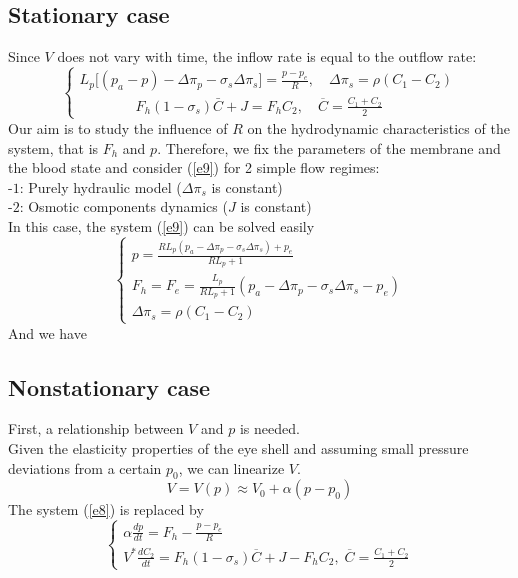 \documentclass[english,12pt]{article}
\begin{document}
\subsection{Stationary case}
Since $V$ does not vary with time, the inflow rate is equal to the outflow rate:
\begin{equation}\label{e9}
\left\{\begin{array}{ll}
L_p \big[ (p_a-p)- \Delta\pi_{p}-\sigma_{s} \Delta\pi_{s}\big]=\displaystyle{\frac{p-p_{e}}{R}}, \quad \Delta\pi_{s}=\rho(C_1-C_{2})\\
\qquad\qquad F_h (1-\sigma_s) \bar{C}+J=F_h C_2, \quad\overline{C}= \displaystyle{\frac{C_1+C_2}{2}}
\end{array}\right.
\end{equation}
Our aim is to study the influence of $R$ on the hydrodynamic characteristics of the system, that is $F_h$ and $p$. Therefore, we fix the parameters of the membrane and the blood state and consider (\ref{e9}) for 2 simple flow regimes:\\
-$1$: Purely hydraulic model ($\Delta\pi_s$ is constant)\\
-$2$: Osmotic components dynamics ($J$ is constant)\\
In this case, the system (\ref{e9}) can be solved easily
\begin{equation}\label{e10}
\left\{\begin{array}{ll}
p=\displaystyle{\frac{R L_p(p_a-\Delta\pi_{p}-\sigma_{s} \Delta\pi_{s})+p_e}{R L_p+1}}\\
F_h=F_e=\displaystyle{\frac{L_p}{R L_p +1}}(p_a-\Delta\pi_{p}-\sigma_{s} \Delta\pi_{s}-p_e)\\
\Delta\pi_{s}=\rho(C_1-C_{2})
\end{array}\right.
\end{equation}
And we have

\subsection{Nonstationary case}
First, a relationship between $V$ and $p$ is needed.\\
Given the elasticity properties of the eye shell and assuming small pressure deviations from a certain $p_0$, we can linearize $V$.
\begin{equation}
V = V(p) \approx V_0 + \alpha (p-p_0)
\end{equation}
The system (\ref{e8}) is replaced by
\begin{equation}\label{e8}
\left\{\begin{array}{ll}
 \alpha \displaystyle{\frac{dp}{dt}}=F_{h}-\displaystyle{\frac{p-p_e}{R}}\\
V^{\ast} \displaystyle{\frac{dC_{2}}{dt}}= F_h(1-\sigma_s)\overline{C} + J - F_hC_2,\; \overline{C}= \frac{C_1+C_2}{2}
\end{array}\right.
\end{equation}
\end{document}

